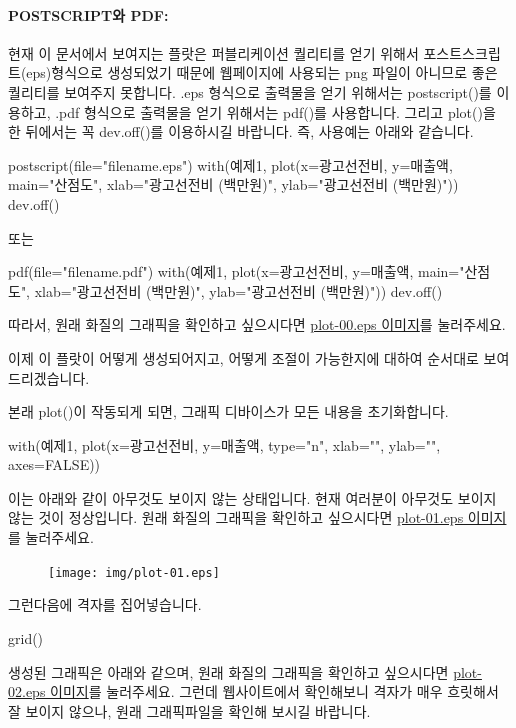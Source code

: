 \paragraph{POSTSCRIPT와 PDF:} 현재 이 문서에서 보여지는 플랏은 퍼블리케이션 퀄리티를 얻기 위해서 포스트스크립트(eps)형식으로 생성되었기 때문에 웹페이지에 사용되는 png 파일이 아니므로 좋은 퀄리티를 보여주지 못합니다.
.eps 형식으로 출력물을 얻기 위해서는 postscript()를 이용하고, .pdf 형식으로 출력물을 얻기 위해서는 pdf()를 사용합니다. 
그리고 plot()을 한 뒤에서는 꼭 dev.off()를 이용하시길 바랍니다. 
즉, 사용예는 아래와 같습니다. 

\begin{Schunk}
\begin{Soutput}	
postscript(file="filename.eps")
with(예제1, plot(x=광고선전비, y=매출액, main="산점도", xlab="광고선전비 (백만원)", ylab="광고선전비 (백만원)"))
dev.off()

또는 

pdf(file="filename.pdf")
with(예제1, plot(x=광고선전비, y=매출액, main="산점도", xlab="광고선전비 (백만원)", ylab="광고선전비 (백만원)"))
dev.off()
\end{Soutput}
\end{Schunk}


따라서, 원래 화질의 그래픽을 확인하고 싶으시다면 \href{http://korea.gnu.org/gnustats/img/plot-00.eps}{plot-00.eps 이미지}를 눌러주세요. 

이제 이 플랏이 어떻게 생성되어지고, 어떻게 조절이 가능한지에 대하여 순서대로 보여드리겠습니다.

본래 plot()이 작동되게 되면, 그래픽 디바이스가 모든 내용을 초기화합니다. 
\begin{Schunk}
\begin{Soutput}	
with(예제1, plot(x=광고선전비, y=매출액, type="n", xlab="", ylab="", axes=FALSE))
\end{Soutput}
\end{Schunk}

이는 아래와 같이 아무것도 보이지 않는 상태입니다. 
현재 여러분이 아무것도 보이지 않는 것이 정상입니다. 
원래 화질의 그래픽을 확인하고 싶으시다면 \href{http://korea.gnu.org/gnustats/img/plot-01.eps}{plot-01.eps 이미지}를 눌러주세요. 

\begin{figure}
\begin{center}
\texttt{[image: img/plot-01.eps]}
\end{center}
\end{figure}
 
 
그런다음에 격자를 집어넣습니다. 
\begin{Schunk}
\begin{Soutput}	
grid()
\end{Soutput}
\end{Schunk}
생성된 그래픽은 아래와 같으며, 원래 화질의 그래픽을 확인하고 싶으시다면 \href{http://korea.gnu.org/gnustats/img/plot-02.eps}{plot-02.eps 이미지}를 눌러주세요.
그런데 웹사이트에서 확인해보니 격자가 매우 흐릿해서 잘 보이지 않으나, 원래 그래픽파일을 확인해 보시길 바랍니다.  

